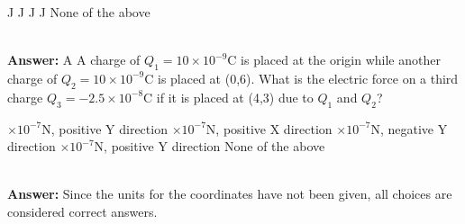 \documentclass[11pt,addpoints]{exam}
\begin{document}
{{{\begin{questions}
					\begin{oneparchoices}
						 J
						 J
						 J
						 J
						\choice None of the above
					\end{oneparchoices} \\ \textbf{Answer:} A
					\question A charge of $Q_1=10\times10^{-9}$C is placed at the origin while another charge of $Q_2=10\times10^{-9}$C is placed at (0,6). What is the electric force on a third charge $Q_3=-2.5\times10^{-8}$C if it is placed at (4,3) due to $Q_1$ and $Q_2$?\\
					\begin{oneparchoices}
						$\times10^{-7}$N, positive Y direction 
						$\times10^{-7}$N, positive X direction
						$\times10^{-7}$N, negative Y direction
						$\times10^{-7}$N, positive Y direction
						\choice None of the above
					\end{oneparchoices}\\ \textbf{Answer:} Since the units for the coordinates have not been given, all choices are considered correct answers.

\end{questions}}}}
\end{document}
